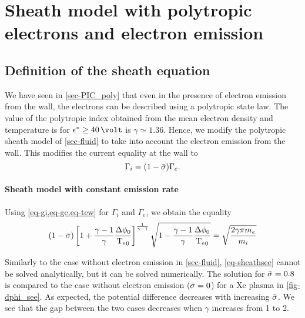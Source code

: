 
\section{Sheath model with polytropic electrons and electron emission}
\label{sec-fluid_poly_see}

\let\oldrightmark=\rightmark
\renewcommand\rightmark{\expandafter\MakeUppercase{Sheath with polytropic electron and SEE}}


\subsection{Definition of the sheath equation} \label{subsec-def_sheat_see}

We have seen in \cref{sec-PIC_poly} that even in the presence of electron emission from the wall, the electrons can be described using a polytropic state law.
The value of the polytropic index obtained from the mean electron density and temperature is for $\crover \geq 40 \,\volt$ is $\gamma \simeq 1.36$.
Hence, we modify the polytropic sheath model of \cref{sec-fluid} to take into account the electron emission from the wall.
This modifies the current equality at the wall to
\begin{equation} \label{eq-see-J_eq}
  \Gamma_i = (1 -  \bar{\sigma }) \Gamma_e.
\end{equation}

\paragraph{Sheath model with constant emission rate\\}

Using \cref{eq-gi,eq-ge,eq-tew} for $\Gamma_i$ and $\Gamma_e$, we obtain the equality
\begin{equation}\label{eq-sheathsee}
  (1 -  \bar{\sigma } )\left[ 1 +\frac{\gamma -1}{\gamma} \frac{ \Delta \phi_0}{ \mathrm{T_e}_0}  \right]^{\frac{1}{\gamma - 1}} \sqrt{1 - \frac{\gamma -1}{\gamma}\frac{\Delta \phi_0}{\mathrm{T_e}_0}} = \sqrt{\frac{2 \gamma \pi m_e}{m_i}}
\end{equation}

Similarly to the case without electron emission in \cref{sec-fluid}, \cref{eq-sheathsee} cannot be solved analytically, but it can be solved numerically.
The solution for $ \bar{\sigma }=0.8$ is compared to the case without electron emission ($ \bar{\sigma }=0$) for a \ac{Xe} plasma in \cref{fig-dphi_see}.
As expected, the potential difference decreases with increasing $ \bar{\sigma }$.
We see that the gap between the two cases decreases when $\gamma$ increases from 1 to 2.

